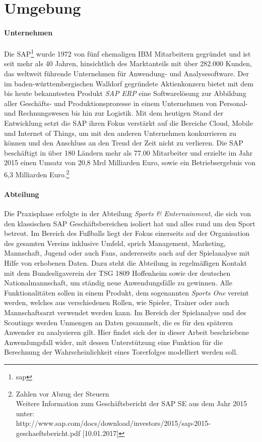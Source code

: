 \section{Umgebung}
\paragraph{Unternehmen}
Die SAP\footnote{\gls{sap}} wurde 1972 von fünf ehemaligen IBM Mitarbeitern gegründet und ist seit mehr als 40 Jahren, hinsichtlich des Marktanteils mit über 282.000 Kunden, das weltweit führende Unternehmen für Anwendung- und Analysesoftware. Der im baden-württembergischen Walldorf gegründete Aktienkonzern bietet mit dem bis heute bekanntesten Produkt \textit{SAP ERP} eine Softwarelösung zur Abbildung aller Geschäfts- und Produktionsprozesse in einem Unternehmen von Personal- und Rechnungswesen bis hin zur Logistik. Mit dem heutigen Stand der Entwicklung setzt die SAP ihren Fokus verstärkt auf die Bereiche Cloud, Mobile und Internet of Things, um mit den anderen Unternehmen konkurrieren zu können und den Anschluss an den Trend der Zeit nicht zu verlieren. Die SAP beschäftigt in über 180 Ländern mehr als 77.00 Mitarbeiter und erzielte im Jahr 2015 einen Umsatz von 20,8 Mrd Milliarden Euro, sowie ein Betriebsergebnis von 6,3 Milliarden Euro.\footnote{Zahlen vor Abzug der Steuern\\ Weitere Information zum Geschäftsbericht der SAP SE aus dem Jahr 2015 unter: \\ http://www.sap.com/docs/download/investors/2015/sap-2015-geschaeftsbericht.pdf [10.01.2017]}

\paragraph{Abteilung}
Die Praxisphase erfolgte in der Abteilung \textit{Sports \& Enternainment}, die sich von den klassischen SAP Geschäftsbereichen isoliert hat und alles rund um den Sport betreut. Im Bereich des Fußballs liegt der Fokus einerseits auf der Organisation des gesamten Vereins inklusive Umfeld, sprich Management, Marketing, Mannschaft, Jugend oder auch Fans, andererseits auch auf der Spielanalyse mit Hilfe von erhobenen Daten. Dazu steht die Abteilung in regelmäßigen Kontakt mit dem Bundesligaverein der TSG 1809 Hoffenheim sowie der deutschen Nationalmannschaft, um ständig neue Anwendungsfälle zu gewinnen. Alle Funktionalitäten sollen in einem Produkt, dem sogenannten \textit{Sports One} vereint werden, welches aus verschiedenen Rollen, wie Spieler, Trainer oder auch Mannschaftsarzt verwendet werden kann. Im Bereich der Spielanalyse und des Scoutings werden Unmengen an Daten gesammelt, die es für den späteren Anwender zu analysieren gilt. Hier findet sich der in dieser Arbeit beschriebene Anwendungsfall wider, mit dessen Unterstützung eine Funktion für die Berechnung der Wahrscheinlichkeit eines Torerfolges modelliert werden soll.